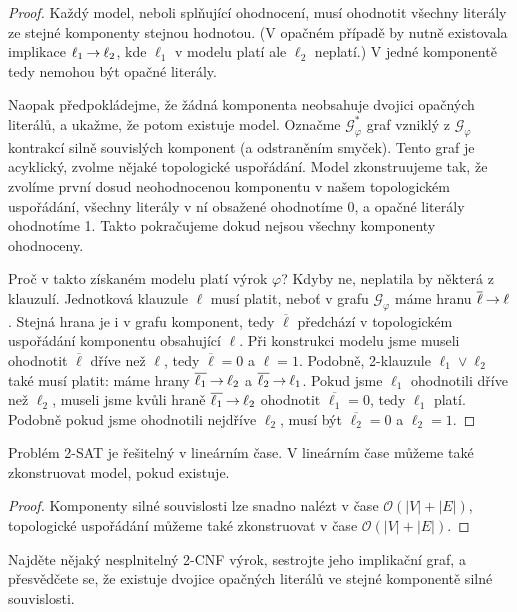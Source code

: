 \begin{proof}
    Každý model, neboli splňující ohodnocení, musí ohodnotit všechny literály ze stejné komponenty stejnou hodnotou. (V opačném případě by nutně existovala implikace $\ell_1\mathbin{\rightarrow}\ell_2$, kde $\ell_1$ v modelu platí ale $\ell_2$ neplatí.) V jedné komponentě tedy nemohou být opačné literály.

    Naopak předpokládejme, že žádná komponenta neobsahuje dvojici opačných literálů, a ukažme, že potom existuje model. Označme $\mathcal G_\varphi^\ast$ graf vzniklý z $\mathcal G_\varphi$ kontrakcí silně souvislých komponent (a odstraněním smyček). Tento graf je acyklický, zvolme nějaké topologické uspořádání. Model zkonstruujeme tak, že zvolíme první dosud neohodnocenou komponentu v našem topologickém uspořádání, všechny literály v ní obsažené ohodnotíme 0, a opačné literály ohodnotíme 1. Takto pokračujeme dokud nejsou všechny komponenty ohodnoceny.

    Proč v takto získaném modelu platí výrok $\varphi$? Kdyby ne, neplatila by některá z klauzulí. Jednotková klauzule $\ell$ musí platit, neboť v grafu $\mathcal G_\varphi$ máme hranu $\overline{\ell}\mathbin{\rightarrow}\ell$. Stejná hrana je i v grafu komponent, tedy $\overline{\ell}$ předchází v topologickém uspořádání komponentu obsahující $\ell$. Při konstrukci modelu jsme museli ohodnotit $\overline{\ell}$ dříve než $\ell$, tedy $\overline{\ell}=0$ a $\ell=1$. Podobně, 2-klauzule $\ell_1\lor\ell_2$ také musí platit: máme hrany $\overline{\ell_1}\mathbin{\rightarrow}\ell_2$ a $\overline{\ell_2}\mathbin{\rightarrow}\ell_1$. Pokud jsme $\ell_1$ ohodnotili dříve než $\ell_2$, museli jsme kvůli hraně $\overline{\ell_1}\mathbin{\rightarrow}\ell_2$ ohodnotit $\overline{\ell_1}=0$, tedy $\ell_1$ platí. Podobně pokud jsme ohodnotili nejdříve $\ell_2$, musí být $\overline{\ell_2}=0$ a $\ell_2=1$. 
\end{proof}

\begin{corollary}
    Problém 2-SAT je řešitelný v lineárním čase. V lineárním čase můžeme také zkonstruovat model, pokud existuje.
\end{corollary}

\begin{proof}
Komponenty silné souvislosti lze snadno nalézt v čase $\mathcal O(|V|+|E|)$, topologické uspořádání můžeme také zkonstruovat v čase $\mathcal O(|V|+|E|)$.
\end{proof}

\begin{exercise}
    Najděte nějaký nesplnitelný 2-CNF výrok, sestrojte jeho implikační graf, a přesvědčete se, že existuje dvojice opačných literálů ve stejné komponentě silné souvislosti.
\end{exercise}

